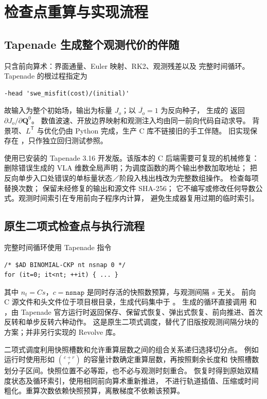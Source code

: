 \documentclass[12pt,a4paper]{article}
\newcommand{\Q}{\mathbf{Q}}
\newcommand{\trans}{^{\mathsf T}}
\begin{document}
\section{检查点重算与实现流程}
\label{sec:dta-checkpoint}

\subsection{Tapenade 生成整个观测代价的伴随}

 只含前向算术：界面通量、Euler 映射、RK2、观测残差以及
完整时间循环。Tapenade 的根过程指定为
\begin{verbatim}
-head 'swe_misfit(cost)/(initial)'
\end{verbatim}
故输入为整个初始场，输出为标量 $J_o$；以 $\overline{J_o}=1$ 为反向种子，
生成的  返回 $\partial J_o/\partial\Q^0$。
数值波速、开放边界映射和观测注入均由同一前向代码自动求导。
背景项、$L\trans$ 与优化仍由 Python 完成，生产 C 库不链接旧的手工伴随。
旧实现保存在 ，只作独立回归测试参照。

使用已安装的 Tapenade 3.16 开发版。该版本的 C 后端需要可复现的机械修复：
删除错误生成的 VLA 维数全局声明；为调度函数的两个输出参数加取地址；
把反向单步入口处错误的单标量状态／阶段入栈出栈改为完整数组操作。
 检查每项替换次数；
保留未经修复的输出和源文件 SHA-256；
它不编写或修改任何导数公式。观测时间索引在专用前向子程序内计算，
避免生成器复用过期的临时索引。

\subsection{原生二项式检查点与执行流程}

完整时间循环使用 Tapenade 指令
\begin{verbatim}
/* $AD BINOMIAL-CKP nt nsnap 0 */
for (it=0; it<nt; ++it) { ... }
\end{verbatim}
其中 $n_t=Cs$，$c=\texttt{nsnap}$ 是同时存活的快照数预算，与观测间隔 $s$ 无关。
前向 C 源文件和头文件位于项目根目录，生成代码集中于 。
生成的循环直接调用  和 ，由 Tapenade
官方运行时返回保存、保留式恢复、弹出式恢复、前向推进、首次反转和单步反转六种动作。
这是原生二项式调度，替代了旧版按观测间隔分块的方案；并非另行实现的 Revolve 库。

二项式调度利用快照槽数和允许重算层数之间的组合关系递归选择切分点。
例如运行时使用形如 $\binom{c+r}{r}$ 的容量计数确定重算层数，再按照剩余长度和
快照槽数划分子区间。快照位置不必等距，也不必与观测时刻重合。
恢复时得到原始双精度状态及循环索引，使用相同前向算术重新推进，
不进行轨道插值、压缩或时间粗化。重算次数依赖快照预算，离散梯度不依赖该预算。
\end{document}
